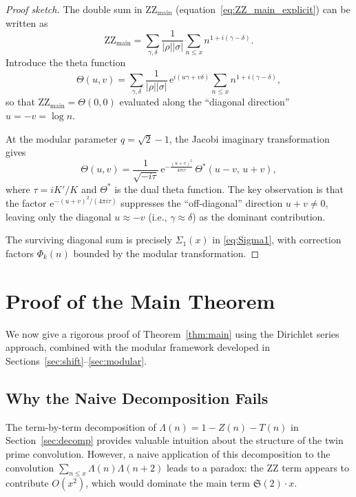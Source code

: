 \documentclass[11pt,a4paper]{article}
\theoremstyle{remark}
\newcommand{\euler}{\mathrm{e}}
\begin{document}
\begin{proof}[Proof sketch]
The double sum in $\mathrm{ZZ}_{\mathrm{main}}$ (equation~\eqref{eq:ZZ_main_explicit}) can be written as
\[
\mathrm{ZZ}_{\mathrm{main}}=\sum_{\gamma,\delta}\frac{1}{|\rho||\sigma|}\sum_{n\le x}n^{1+i(\gamma-\delta)}.
\]
Introduce the theta function
\[
\Theta(u,v)=\sum_{\gamma,\delta}\frac{1}{|\rho||\sigma|}\,\euler^{i(u\gamma+v\delta)}\sum_{n\le x}n^{1+i(\gamma-\delta)},
\]
so that $\mathrm{ZZ}_{\mathrm{main}}=\Theta(0,0)$ evaluated along the ``diagonal direction'' $u=-v=\log n$.

At the modular parameter $q=\sqrt{2}-1$, the Jacobi imaginary transformation gives
\[
\Theta(u,v) = \frac{1}{\sqrt{-i\tau}}\,\euler^{-\frac{(u+v)^2}{4\pi i\tau}}\,\Theta^*(u-v,\,u+v),
\]
where $\tau=i K'/K$ and $\Theta^*$ is the dual theta function.
The key observation is that the factor $\euler^{-(u+v)^2/(4\pi i\tau)}$ suppresses the ``off-diagonal'' direction $u+v\ne 0$, leaving only the diagonal $u\approx -v$ (i.e., $\gamma\approx\delta$) as the dominant contribution.

The surviving diagonal sum is precisely $\Sigma_1(x)$ in \eqref{eq:Sigma1}, with correction factors $\Phi_k(n)$ bounded by the modular transformation.
\end{proof}

\section{Proof of the Main Theorem}\label{sec:proof}

We now give a rigorous proof of Theorem~\ref{thm:main} using the Dirichlet series approach, combined with the modular framework developed in Sections~\ref{sec:shift}--\ref{sec:modular}.

\subsection{Why the Naive Decomposition Fails}

The term-by-term decomposition of $\Lambda(n) = 1 - Z(n) - T(n)$ in Section~\ref{sec:decomp} provides valuable intuition about the structure of the twin prime convolution. However, a naive application of this decomposition to the convolution $\sum_{n\le x}\Lambda(n)\Lambda(n+2)$ leads to a paradox: the ZZ term appears to contribute $O(x^2)$, which would dominate the main term $\mathfrak{S}(2)\cdot x$.
\end{document}
